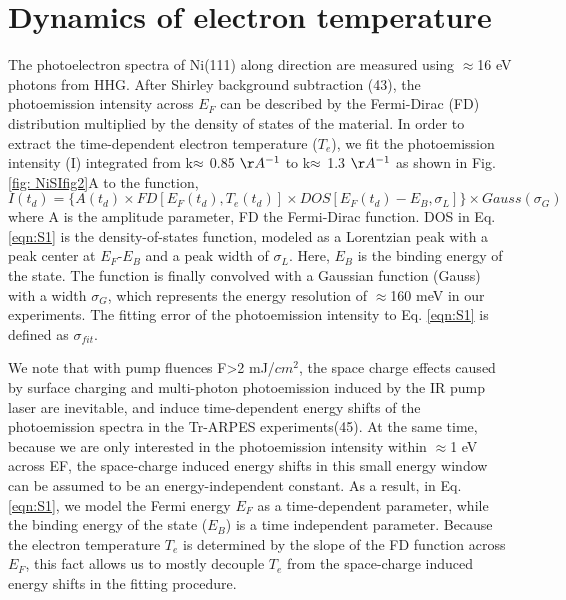 \section{Dynamics of electron temperature}
The photoelectron spectra of Ni(111) along  direction are measured using $\approx$16 eV photons from HHG. After Shirley background subtraction (43), the photoemission intensity across $E_{F}$ can be described by the Fermi-Dirac (FD) distribution multiplied by the density of states of the material. In order to extract the time-dependent electron temperature ($T_e$), we fit the photoemission intensity (I) integrated from k$\/\/ \approx$ 0.85 $\AA^{-1}$  to k$\/\/ \approx$ 1.3 $\AA^{-1}$ as shown in Fig. \ref{fig: NiSIfig2}A to the function,
\begin{equation}
I(t_{d})=\{A(t_d)\times FD[E_F(t_d),T_e(t_d)]\times DOS[E_F(t_d)-E_B,\sigma_L]\}\times\textit{Gauss}(\sigma_G)
\label{eqn:S1}
\end{equation}
where A is the amplitude parameter, FD the Fermi-Dirac function. DOS in Eq. \ref{eqn:S1} is the density-of-states function, modeled as a Lorentzian peak with a peak center at $E_F$-$E_B$ and a peak width of $\sigma_L$. Here, $E_B$ is the binding energy of the state. The function is finally convolved with a Gaussian function (Gauss) with a width $\sigma_G$, which represents the energy resolution of $\approx$160 meV in our experiments. The fitting error of the photoemission intensity to Eq. \ref{eqn:S1} is defined as $\sigma_{fit}$.

We note that with pump fluences F>2 mJ/$cm^2$, the space charge effects caused by surface charging and multi-photon photoemission induced by the IR pump laser are inevitable, and induce time-dependent energy shifts of the photoemission spectra in the Tr-ARPES experiments(45). At the same time, because we are only interested in the photoemission intensity within $\approx$1 eV across EF, the space-charge induced energy shifts in this small energy window can be assumed to be an energy-independent constant. As a result, in Eq. \ref{eqn:S1}, we model the Fermi energy $E_F$ as a time-dependent parameter, while the binding energy of the state ($E_B$) is a time independent parameter. Because the electron temperature $T_e$ is determined by the slope of the FD function across $E_F$, this fact allows us to mostly decouple $T_e$ from the space-charge induced energy shifts in the fitting procedure.

